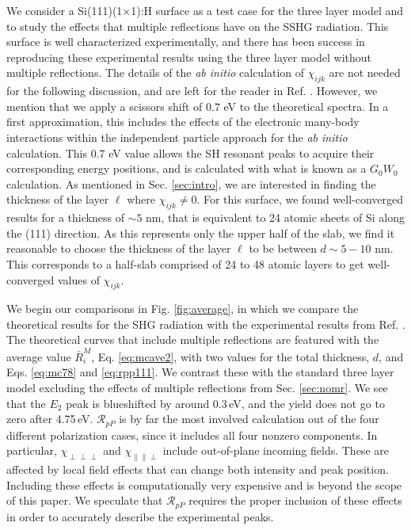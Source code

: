 We consider a Si(111)(1$\times$1):H surface as a test case for the three layer model and to study the effects that multiple reflections have on the SSHG radiation. This surface is well characterized experimentally,\cite{mitchellSS01, mejiaPRB02, bergfeldPRL04} and there has been success in reproducing these experimental results using the three layer model without multiple reflections.\cite{andersonPRB16} The details of the \emph{ab initio} calculation of $\chi_{ijk}$ are not needed for the following discussion, and are left for the reader in Ref. \cite{andersonPRB16}. However, we mention that we apply a scissors shift of 0.7 eV to the theoretical spectra. In a first approximation, this includes the effects of the electronic many-body interactions within the independent particle approach for the \emph{ab initio} calculation. This 0.7 eV value allows the SH resonant peaks to acquire their corresponding energy positions, and is calculated with what is known as a $G_{0}W_{0}$ calculation.\cite{andersonPRB16} As mentioned in Sec. \ref{sec:intro}, we are interested in finding the thickness of the layer $\ell$ where $\chi_{ijk} \ne 0$. For this surface, we found well-converged results for a thickness of $\sim 5$ nm, that is equivalent to 24 atomic sheets of Si along the (111) direction. As this represents only the upper half of the slab, we find it reasonable to choose the thickness of the layer $\ell$ to be between $d\sim 5-10$ nm. This corresponds to a half-slab comprised of 24 to 48 atomic layers to get well-converged values of $\chi_{ijk}$.

We begin our comparisons in Fig. \ref{fig:average}, in which we compare the theoretical results for the SHG radiation with the experimental results from Ref. \cite{mejiaPRB02}. The theoretical curves that include multiple reflections are featured with the average value $\bar{R}^{M}_{i}$, Eq. \eqref{eq:mcave2}, with two values for the total thickness, $d$, and Eqs. \eqref{eq:mc78} and \eqref{eq:rpp111}. We contrast these with the standard three layer model excluding the effects of multiple reflections from Sec. \ref{sec:nomr}. We see that the $E_{2}$ peak is blueshifted by around 0.3\,eV, and the yield does not go to zero after 4.75\,eV. $\mathcal{R}_{pP}$ is by far the most involved calculation out of the four different polarization cases, since it includes all four nonzero components. In particular, $\chi_{\perp\perp\perp}$ and $\chi_{\parallel\parallel\perp}$ include out-of-plane incoming fields. These are affected by local field effects that can change both intensity and peak position.\cite{tancognedejean:tel-01235611} Including these effects is computationally very expensive and is beyond the scope of this paper. We speculate that $\mathcal{R}_{pP}$ requires the proper inclusion of these effects in order to accurately describe the experimental peaks.

